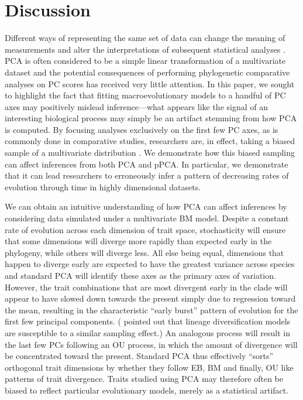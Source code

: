 \documentclass[a4paper,11pt]{article}
\begin{document}
\section{Discussion}
Different ways of representing the same set of data can change the meaning of measurements and alter the interpretations of subsequent statistical analyses \citep{Houle2011}. PCA is often considered to be a simple linear transformation of a multivariate dataset and the potential consequences of performing phylogenetic comparative analyses on PC scores has received very little attention. In this paper, we sought to highlight the fact that fitting macroevolutionary models to a handful of PC axes may positively mislead inference---what appears like the signal of an interesting biological process may simply be an artifact stemming from how PCA is computed. By focusing analyses exclusively on the first few PC axes, as is commonly done in comparative studies, researchers are, in effect, taking a biased sample of a multivariate distribution \citep{Mitteroecker}. We demonstrate how this biased sampling can affect inferences from both PCA and pPCA. In particular, we demonstrate that it can lead researchers to erroneously infer a pattern of decreasing rates of evolution through time in highly dimensional datasets.

We can obtain an intuitive understanding of how PCA can affect inferences by considering data simulated under a multivariate BM model. Despite a constant rate of evolution across each dimension of trait space, stochasticity will ensure that some dimensions will diverge more rapidly than expected early in the phylogeny, while others will diverge less. All else being equal, dimensions that happen to diverge early are expected to have the greatest variance across species and standard PCA will identify these axes as the primary axes of variation. However, the trait combinations that are most divergent early in the clade will appear to have slowed down towards the present simply due to regression toward the mean, resulting in the characteristic ``early burst'' pattern of evolution for the first few principal components. (\citealt{Pennell2012} pointed out that lineage diversification models are susceptible to a similar sampling effect.) An analogous process will result in the last few PCs following an OU process, in which the amount of divergence will be concentrated toward the present. Standard PCA thus effectively ``sorts'' orthogonal trait dimensions by whether they follow EB, BM and finally, OU like patterns of trait divergence. Traits studied using PCA may therefore often be biased to reflect particular evolutionary models, merely as a statistical artifact.
\end{document}
